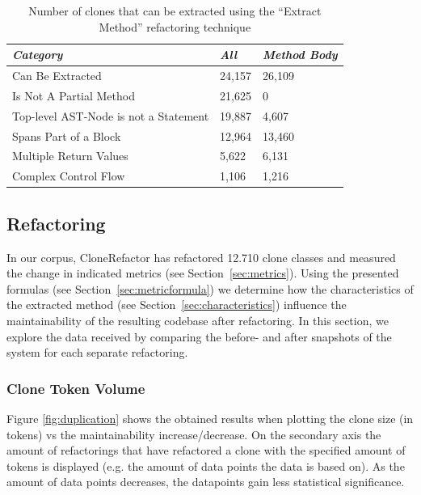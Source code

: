 \begin{table}[H]
\centering
\begin{tabular}{@{}lll@{}}
\toprule
\textit{\textbf{Category}} & \textit{\textbf{All}} & \textit{\textbf{Method Body}} \\ \midrule
Can Be Extracted & 24,157 & 26,109 \\
Is Not A Partial Method & 21,625 & 0 \\
Top-level AST-Node is not a Statement & 19,887 & 4,607 \\
Spans Part of a Block & 12,964 & 13,460 \\
Multiple Return Values & 5,622 & 6,131 \\
Complex Control Flow & 1,106 & 1,216 \\ \bottomrule
\end{tabular}
\caption{Number of clones that can be extracted using the ``Extract Method'' refactoring technique}
\label{tab:refactorability}
\end{table}

\subsection{Refactoring}
In our corpus, CloneRefactor has refactored 12.710 clone classes and measured the change in indicated metrics (see Section~\ref{sec:metrics}). Using the presented formulas (see Section~\ref{sec:metricformula}) we determine how the characteristics of the extracted method (see Section~\ref{sec:characteristics}) influence the maintainability of the resulting codebase after refactoring. In this section, we explore the data received by comparing the before- and after snapshots of the system for each separate refactoring.

\subsubsection{Clone Token Volume}
Figure \ref{fig:duplication} shows the obtained results when plotting the clone size (in tokens) vs the maintainability increase/decrease. On the secondary axis the amount of refactorings that have refactored a clone with the specified amount of tokens is displayed (e.g. the amount of data points the data is based on). As the amount of data points decreases, the datapoints gain less statistical significance.

